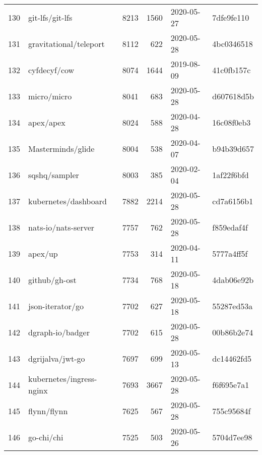\begin{footnotesize}
\begin{longtable}{llrrll}
        130 &                                    git-lfs/git-lfs &   8213 &   1560 & 2020-05-27 &  7dfe9fe110 \\
        131 &                             gravitational/teleport &   8112 &    622 & 2020-05-28 &  4bc0346518 \\
        132 &                                       cyfdecyf/cow &   8074 &   1644 & 2019-08-09 &  41c0fb157c \\
        133 &                                        micro/micro &   8041 &    683 & 2020-05-28 &  d607618d5b \\
        134 &                                          apex/apex &   8024 &    588 & 2020-04-28 &  16c08f0eb3 \\
        135 &                                  Masterminds/glide &   8004 &    538 & 2020-04-07 &  b94b39d657 \\
        136 &                                      sqshq/sampler &   8003 &    385 & 2020-02-04 &  1af22f6bfd \\
        137 &                               kubernetes/dashboard &   7882 &   2214 & 2020-05-28 &  cd7a6156b1 \\
        138 &                                nats-io/nats-server &   7757 &    762 & 2020-05-28 &  f859edaf4f \\
        139 &                                            apex/up &   7753 &    314 & 2020-04-11 &  5777a4ff5f \\
        140 &                                      github/gh-ost &   7734 &    768 & 2020-05-18 &  4dab06e92b \\
        141 &                                   json-iterator/go &   7702 &    627 & 2020-05-18 &  55287ed53a \\
        142 &                                   dgraph-io/badger &   7702 &    615 & 2020-05-28 &  00b86b2e74 \\
        143 &                                   dgrijalva/jwt-go &   7697 &    699 & 2020-05-13 &  dc14462fd5 \\
        144 &                           kubernetes/ingress-nginx &   7693 &   3667 & 2020-05-28 &  f6f695e7a1 \\
        145 &                                        flynn/flynn &   7625 &    567 & 2020-05-28 &  755c95684f \\
        146 &                                         go-chi/chi &   7525 &    503 & 2020-05-26 &  5704d7ee98 \\

\end{longtable}
\end{footnotesize}
